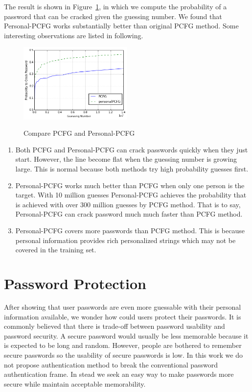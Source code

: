 \documentclass{sig-alternate}
\begin{document}
The result is shown in Figure~\ref{f3}, in which we compute the probability of a password that can be cracked given the guessing number. We found that Personal-PCFG works substantially better than original PCFG method. Some interesting observations are listed in following.

\begin{figure}[h!]
\centering
  \caption{Compare PCFG and Personal-PCFG}{}
  \label{f3}
  \centering
    \includegraphics[width=0.5\textwidth]{fig/cmp}
\end{figure}

\begin{enumerate}[leftmargin=*]
\item Both PCFG and Personal-PCFG can crack passwords quickly when they just start. However, the line become flat when the guessing number is growing large. This is normal because both methods try high probability guesses first. 

\item Personal-PCFG works much better than PCFG when only one person is the target. With 10 million guesses Personal-PCFG achieves the probability that is achieved with over 300 million guesses by PCFG method. That is to say, Personal-PCFG can crack password much much faster than PCFG method. 

\item Personal-PCFG covers more passwords than PCFG method. This is because personal information provides rich personalized strings which may not  be covered in the training set.  

\end{enumerate}


\section{Password Protection}
\label{passwordprotection}
After showing that user passwords are even more guessable with their personal information available, we wonder how could users protect their passwords. It is commonly believed that there is trade-off between password usability and password security. A secure password would usually be less memorable because it is expected to be long and random. However, people are bothered to remember secure passwords so the usability of secure passwords is low. In this work we do not propose authentication method to break the conventional password authentication frame. In stead we seek an easy way to make passwords more secure while maintain acceptable memorability.
\end{document}
